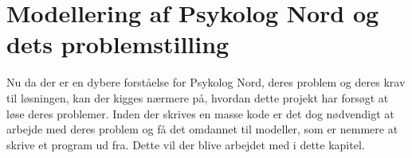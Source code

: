 \section{Modellering af Psykolog Nord og dets problemstilling}

Nu da der er en dybere forståelse for Psykolog Nord, deres problem og deres krav til løsningen, kan der kigges nærmere på, hvordan dette projekt har forsøgt at løse deres problemer.
Inden der skrives en masse kode er det dog nødvendigt at arbejde med deres problem og få det omdannet til modeller, som er nemmere at skrive et program ud fra.
Dette vil der blive arbejdet med i dette kapitel.